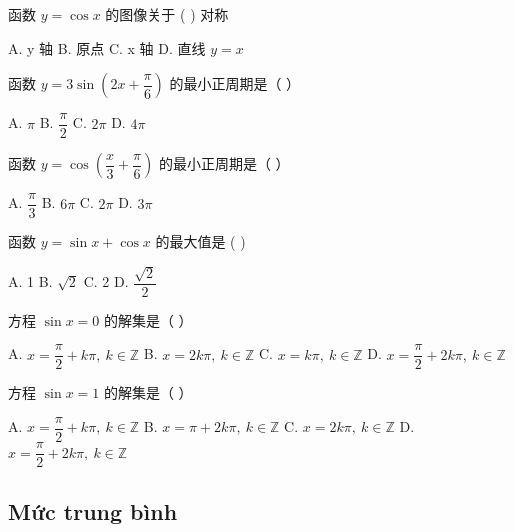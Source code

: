 \documentclass[11pt, a4paper]{article}
\begin{document}
\begin{baitap}[1]
函数 $y = \cos x$ 的图像关于 ( ) 对称
\par\vspace{3pt}
\noindent A. y 轴 \quad B. 原点 \quad C. x 轴 \quad D. 直线 $y = x$
\end{baitap}
\begin{baitap}[2]
函数 $y = 3\sin\!\left(2x + \dfrac{\pi}{6}\right)$ 的最小正周期是（ ）
\par\vspace{3pt}
\noindent A. $\pi$ \quad B. $\dfrac{\pi}{2}$ \quad C. $2\pi$ \quad D. $4\pi$
\end{baitap}
\begin{baitap}[3]
函数 $y = \cos\!\left(\dfrac{x}{3} + \dfrac{\pi}{6}\right)$ 的最小正周期是（ ）
\par\vspace{3pt}
\noindent A. $\dfrac{\pi}{3}$ \quad B. $6\pi$ \quad C. $2\pi$ \quad D. $3\pi$
\end{baitap}
\begin{baitap}[4]
函数 $y = \sin x + \cos x$ 的最大值是 ( )
\par\vspace{3pt}
\noindent A. 1 \quad B. $\sqrt{2}$ \quad C. 2 \quad D. $\dfrac{\sqrt{2}}{2}$
\end{baitap}
\begin{baitap}[5]
方程 $\sin x = 0$ 的解集是（ ）
\par\vspace{3pt}
\noindent A. $x = \dfrac{\pi}{2} + k\pi,\ k \in \mathbb{Z}$ \quad B. $x = 2k\pi,\ k \in \mathbb{Z}$ \quad C. $x = k\pi,\ k \in \mathbb{Z}$ \quad D. $x = \dfrac{\pi}{2} + 2k\pi,\ k \in \mathbb{Z}$
\end{baitap}
\begin{baitap}[6]
方程 $\sin x = 1$ 的解集是（ ）
\par\vspace{3pt}
\noindent A. $x = \dfrac{\pi}{2} + k\pi,\ k \in \mathbb{Z}$ \quad B. $x = \pi + 2k\pi,\ k \in \mathbb{Z}$ \quad C. $x = 2k\pi,\ k \in \mathbb{Z}$ \quad D. $x = \dfrac{\pi}{2} + 2k\pi,\ k \in \mathbb{Z}$
\end{baitap}
\subsection{Mức trung bình}
\end{document}
